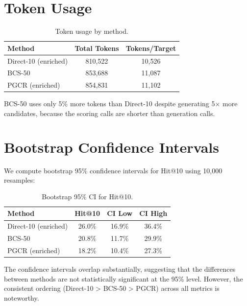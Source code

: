 \documentclass[wcp]{jmlr}
\begin{document}
\section{Token Usage}\label{apd:tokens}

\begin{table}[htp]
\centering
\caption{Token usage by method.}\label{tab:tokens}
\begin{tabular}{lcc}
\toprule
Method & Total Tokens & Tokens/Target \\
\midrule
Direct-10 (enriched) & 810,522 & 10,526 \\
BCS-50 & 853,688 & 11,087 \\
PGCR (enriched) & 854,831 & 11,102 \\
\bottomrule
\end{tabular}
\end{table}

BCS-50 uses only 5\% more tokens than Direct-10 despite generating 5$\times$ more candidates, because the scoring calls are shorter than generation calls.

\section{Bootstrap Confidence Intervals}\label{apd:bootstrap}

We compute bootstrap 95\% confidence intervals for Hit@10 using 10,000 resamples:

\begin{table}[htp]
\centering
\caption{Bootstrap 95\% CI for Hit@10.}\label{tab:ci}
\begin{tabular}{lccc}
\toprule
Method & Hit@10 & CI Low & CI High \\
\midrule
Direct-10 (enriched) & 26.0\% & 16.9\% & 36.4\% \\
BCS-50 & 20.8\% & 11.7\% & 29.9\% \\
PGCR (enriched) & 18.2\% & 10.4\% & 27.3\% \\
\bottomrule
\end{tabular}
\end{table}

The confidence intervals overlap substantially, suggesting that the differences between methods are not statistically significant at the 95\% level. However, the consistent ordering (Direct-10 > BCS-50 > PGCR) across all metrics is noteworthy.
\end{document}
